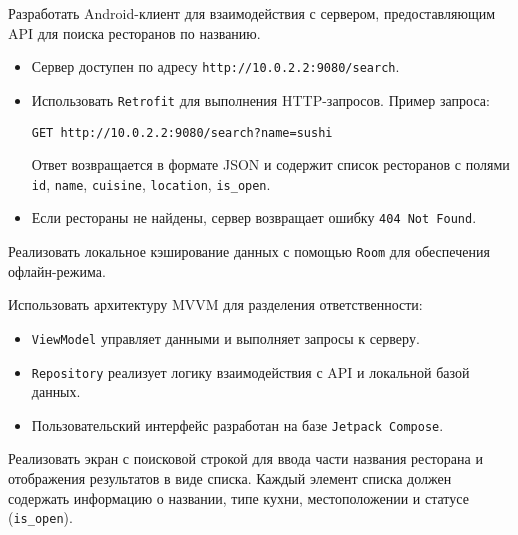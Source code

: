 \documentclass[a4paper,12pt]{article}
\begin{document}
Разработать Android-клиент для взаимодействия с сервером, предоставляющим API для поиска ресторанов по названию.

\begin{itemize}
    \item Сервер доступен по адресу \texttt{http://10.0.2.2:9080/search}.
    \item Использовать \texttt{Retrofit} для выполнения HTTP-запросов. Пример запроса:
\begin{verbatim}
GET http://10.0.2.2:9080/search?name=sushi
\end{verbatim}
Ответ возвращается в формате JSON и содержит список ресторанов с полями \texttt{id}, 
\texttt{name}, \texttt{cuisine}, \texttt{location}, \texttt{is\_open}.
    \item Если рестораны не найдены, сервер возвращает ошибку \texttt{404 Not Found}.
\end{itemize}

Реализовать локальное кэширование данных с помощью \texttt{Room} для обеспечения офлайн-режима.

Использовать архитектуру MVVM для разделения ответственности:
\begin{itemize}
    \item \texttt{ViewModel} управляет данными и выполняет запросы к серверу.
    \item \texttt{Repository} реализует логику взаимодействия с API и локальной базой данных.
    \item Пользовательский интерфейс разработан на базе \texttt{Jetpack Compose}.
\end{itemize}

Реализовать экран с поисковой строкой для ввода части названия ресторана и отображения результатов в виде списка. Каждый элемент списка должен содержать информацию о названии, типе кухни, местоположении и статусе (\texttt{is\_open}).
\end{document}
